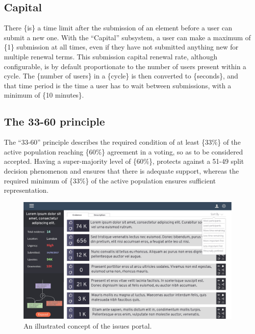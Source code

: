 \documentclass[a4paper,11pt]{article}
\begin{document}
\begin{multicols}{2}
\subsection{Capital} \label{capital}

There \{is\} a time limit after the submission of an element before a user can submit a new one. With the “Capital” subsystem, a user can make a maximum of \{1\} submission at all times, even if they have not submitted anything new for multiple renewal terms. This submission capital renewal rate, although configurable, is by default proportionate to the number of users present within a cycle. The \{number of users\} in a \{cycle\} is then converted to \{seconds\}, and that time period is the time a user has to wait between submissions, with a minimum of \{10 minutes\}. 

\subsection{The 33-60 principle} \label{principle}

The ``33-60'' principle describes the required condition of at least \{33\%\} of the active population reaching \{60\%\} agreement in a voting, so as to be considered accepted. Having a super-majority level of \{60\%\}, protects against a 51-49 split decision phenomenon and ensures that there is adequate support, whereas the required minimum of \{33\%\} of the active population ensures sufficient representation.

\begin{figure}
\centering
\includegraphics[width=140mm]{FigureA.jpg}
\caption{An illustrated concept of the issues portal.}
\label{figure1}
\end{figure}


\end{multicols}
\end{document}
